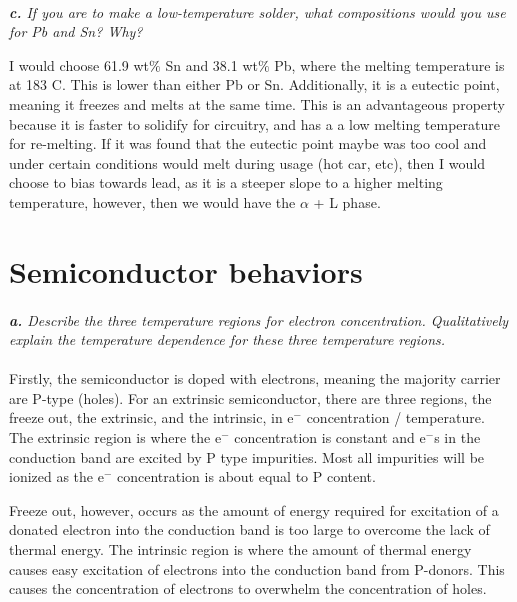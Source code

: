 \documentclass[letterpaper]{article}
\begin{document}
    \paragraph{}
    \textit{
        \textbf{c.} 
        If you are to make a low-temperature solder, what compositions would you use for Pb and Sn? Why?
        }

        I would choose 61.9 wt$\%$ Sn and 38.1 wt$\%$ Pb, where the melting temperature is at 183 C.
        This is lower than either Pb or Sn. Additionally, it is a eutectic point, meaning it freezes and melts at the same time.
        This is an advantageous property because it is faster to solidify for circuitry, and has a a low melting temperature for re-melting.
        If it was found that the eutectic point maybe was too cool and under certain conditions would melt during usage (hot car, etc), 
        then I would choose to bias towards lead, as it is a steeper slope to a higher melting temperature, however, then we would have 
        the $\alpha$ + L phase.


\section{Semiconductor behaviors}
    \paragraph{}
    \textit{
        \textbf{a.} 
        Describe the three temperature regions for electron concentration. 
        Qualitatively explain the temperature dependence for these three temperature regions.
        }

    \paragraph{}

Firstly, the semiconductor is doped with electrons, meaning the majority carrier are P-type (holes).
For an extrinsic semiconductor, there are three regions, the freeze out, the extrinsic, and the intrinsic, in e$^{-}$ concentration / temperature.
The extrinsic region is where the e$^{-}$ concentration is constant and e$^{-}$s in the conduction band are excited by P type impurities. 
Most all impurities will be ionized as the e$^{-}$ concentration is about equal to P content. 

Freeze out, however, occurs as the amount of energy required for excitation of a donated electron into the conduction band is too large to overcome the lack of thermal energy.
The intrinsic region is where the amount of thermal energy causes easy excitation of electrons into the conduction band from P-donors.
This causes the concentration of electrons to overwhelm the concentration of holes.
\end{document}
